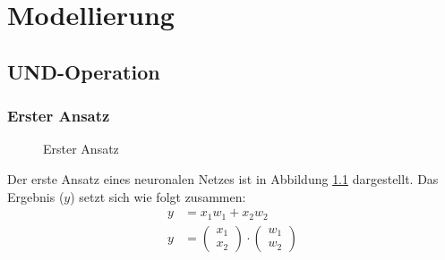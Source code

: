 \chapter{Modellierung}
\section{UND-Operation}
\subsection{Erster Ansatz}
\begin{figure}[ht]
    \centering
    \caption{Erster Ansatz}
    \label{fig:net0}
\end{figure}

Der erste Ansatz eines neuronalen Netzes ist in Abbildung \ref{fig:net0} dargestellt.
Das Ergebnis ($y$) setzt sich wie folgt zusammen:
\begin{align}
    y&=x_1w_1+x_2w_2 \\
    y&=\begin{pmatrix} x_1 \\ x_2 \end{pmatrix}\cdot\begin{pmatrix} w_1 \\ w_2 \end{pmatrix}
\end{align}

